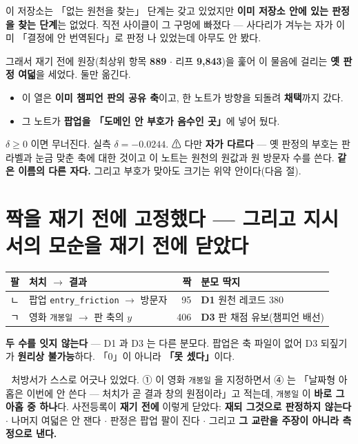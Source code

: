\documentclass{article}
\begin{document}
이 저장소는 「없는 원천을 찾는」 단계는 갖고 있었지만
\textbf{이미 저장소 안에 있는 판정을 찾는 단계}는 없었다.
직전 사이클이 그 구멍에 빠졌다 --- 사다리가 겨누는 자가 이미 「결정에 안 번역된다」로
판정 나 있었는데 아무도 안 봤다.

그래서 재기 전에 원장(최상위 항목 \textbf{889} $\cdot$ 리프 \textbf{9,843})을 훑어
이 물음에 걸리는 \textbf{옛 판정 여덟}을 세었다. 둘만 옮긴다.

\begin{itemize}
\item 이 열은 \textbf{이미 챔피언 판의 공유 축}이고, 한 노트가 방향을 되돌려 \textbf{채택}까지 갔다.
\item 그 노트가 \textbf{팝업을 「도메인 안 부호가 음수인 곳」}에 넣어 뒀다.
\end{itemize}

{$\delta \geq 0$ 이면 무너진다. 실측 $\delta = -0.0244$.}
⚠ 다만 \textbf{자가 다르다} --- 옛 판정의 부호는 판 라벨과 눈금 맞춘 축에 대한 것이고
이 노트는 원천의 원값과 원 방문자 수를 쓴다. \textbf{같은 이름의 다른 자다.}
그리고 부호가 맞아도 크기는 위약 안이다(다음 절).

\section{짝을 재기 전에 고정했다 --- 그리고 지시서의 모순을 재기 전에 닫았다}

\begin{center}
\begin{tabular}{llrl}
\toprule
팔 & 처치 $\to$ 결과 & 짝 & 분모 딱지 \\
\midrule
ㄴ & 팝업 \texttt{entry\_friction} $\to$ 방문자 & 95 & \textbf{D1} 원천 레코드 380 \\
ㄱ & 영화 \texttt{개봉일} $\to$ 판 축의 $y$ & 406 & \textbf{D3} 판 채점 유보(챔피언 배선) \\
\bottomrule
\end{tabular}
\end{center}

\textbf{두 수를 잇지 않는다} --- D1 과 D3 는 다른 분모다.
팝업은 축 파일이 없어 D3 되짚기가 \textbf{원리상 불가능}하다. 「0」이 아니라 \textbf{「못 셌다」}이다.

🔴 처방서가 스스로 어긋나 있었다. ① 이 영화 \texttt{개봉일} 을 지정하면서
④ 는 「날짜형 아홉은 이번에 안 쓴다 --- 처치가 곧 결과 창의 원점이라」고 적는데,
\texttt{개봉일} 이 \textbf{바로 그 아홉 중 하나}다.
사전등록이 \textbf{재기 전에} 이렇게 닫았다: \textbf{재되 그것으로 판정하지 않는다} $\cdot$
나머지 여덟은 안 잰다 $\cdot$ 판정은 팝업 팔이 진다 $\cdot$
그리고 \textbf{그 교란을 주장이 아니라 측정으로 낸다.}
\end{document}

